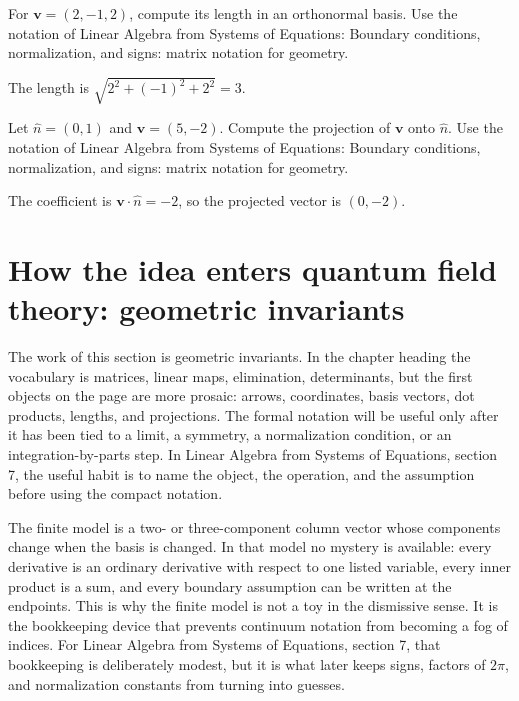 \begin{exercise}
For \(\bm v=(2,-1,2)\), compute its length in an orthonormal basis.  Use the notation of Linear Algebra from Systems of Equations: Boundary conditions, normalization, and signs: matrix notation for geometry.
\begin{answer}
The length is \(\sqrt{2^2+(-1)^2+2^2}=3\).
\end{answer}
\end{exercise}

\begin{exercise}
Let \(\hat n=(0,1)\) and \(\bm v=(5,-2)\).  Compute the projection of \(\bm v\) onto \(\hat n\).  Use the notation of Linear Algebra from Systems of Equations: Boundary conditions, normalization, and signs: matrix notation for geometry.
\begin{answer}
The coefficient is \(\bm v\cdot\hat n=-2\), so the projected vector is \((0,-2)\).
\end{answer}
\end{exercise}



\section{How the idea enters quantum field theory: geometric invariants}

The work of this section is geometric invariants.  In the chapter heading the vocabulary is matrices, linear maps, elimination, determinants, but the first objects on the page are more prosaic: arrows, coordinates, basis vectors, dot products, lengths, and projections.  The formal notation will be useful only after it has been tied to a limit, a symmetry, a normalization condition, or an integration-by-parts step.  In Linear Algebra from Systems of Equations, section 7, the useful habit is to name the object, the operation, and the assumption before using the compact notation.

The finite model is a two- or three-component column vector whose components change when the basis is changed.  In that model no mystery is available: every derivative is an ordinary derivative with respect to one listed variable, every inner product is a sum, and every boundary assumption can be written at the endpoints.  This is why the finite model is not a toy in the dismissive sense.  It is the bookkeeping device that prevents continuum notation from becoming a fog of indices.  For Linear Algebra from Systems of Equations, section 7, that bookkeeping is deliberately modest, but it is what later keeps signs, factors of \(2\pi\), and normalization constants from turning into guesses.

